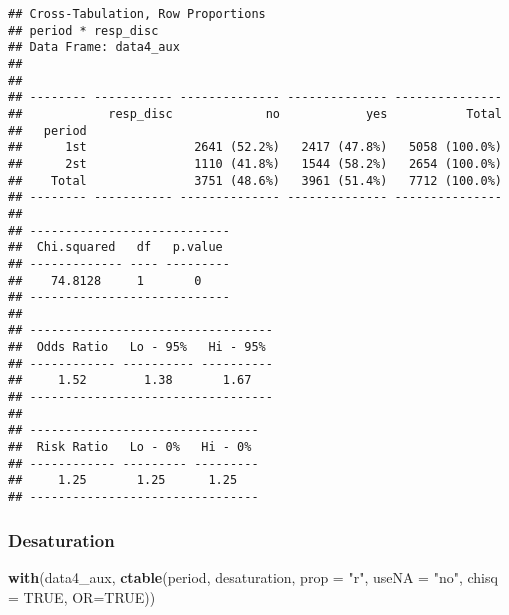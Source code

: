 \documentclass[
]{article}
\newenvironment{Shaded}{\begin{snugshade}}{\end{snugshade}}
\newcommand{\DataTypeTok}[1]{\textcolor[rgb]{0.13,0.29,0.53}{#1}}
\newcommand{\KeywordTok}[1]{\textcolor[rgb]{0.13,0.29,0.53}{\textbf{#1}}}
\newcommand{\NormalTok}[1]{#1}
\newcommand{\OtherTok}[1]{\textcolor[rgb]{0.56,0.35,0.01}{#1}}
\newcommand{\StringTok}[1]{\textcolor[rgb]{0.31,0.60,0.02}{#1}}
\begin{document}
\begin{verbatim}
## Cross-Tabulation, Row Proportions  
## period * resp_disc  
## Data Frame: data4_aux  
## 
## 
## -------- ----------- -------------- -------------- ---------------
##            resp_disc             no            yes           Total
##   period                                                          
##      1st               2641 (52.2%)   2417 (47.8%)   5058 (100.0%)
##      2st               1110 (41.8%)   1544 (58.2%)   2654 (100.0%)
##    Total               3751 (48.6%)   3961 (51.4%)   7712 (100.0%)
## -------- ----------- -------------- -------------- ---------------
## 
## ----------------------------
##  Chi.squared   df   p.value 
## ------------- ---- ---------
##    74.8128     1       0    
## ----------------------------
## 
## ----------------------------------
##  Odds Ratio   Lo - 95%   Hi - 95% 
## ------------ ---------- ----------
##     1.52        1.38       1.67   
## ----------------------------------
## 
## --------------------------------
##  Risk Ratio   Lo - 0%   Hi - 0% 
## ------------ --------- ---------
##     1.25       1.25      1.25   
## --------------------------------
\end{verbatim}

\hypertarget{desaturation-2}{%
\subsubsection{Desaturation}\label{desaturation-2}}

\begin{Shaded}
\begin{Highlighting}[]
\KeywordTok{with}\NormalTok{(data4_aux, }\KeywordTok{ctable}\NormalTok{(period, desaturation, }\DataTypeTok{prop =} \StringTok{"r"}\NormalTok{, }\DataTypeTok{useNA =} \StringTok{"no"}\NormalTok{, }\DataTypeTok{chisq =} \OtherTok{TRUE}\NormalTok{, }\DataTypeTok{OR=}\OtherTok{TRUE}\NormalTok{))}
\end{Highlighting}
\end{Shaded}
\end{document}
